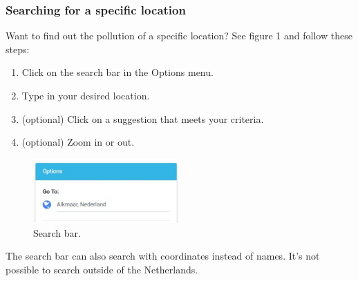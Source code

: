\documentclass[a4paper]{article}
\begin{document}
\subsubsection*{Searching for a specific location}
Want to find out the pollution of a specific location? See figure 1 and follow these steps:
\begin{enumerate}
\item Click on the search bar in the Options menu.
\item Type in your desired location.
\item (optional) Click on a suggestion that meets your criteria.
\item (optional) Zoom in or out.
\end{enumerate}
\begin{figure}[h!]
  \caption{Search bar.}
  \centering
  \includegraphics[width=0.5\textwidth]{search}
\end{figure}
The search bar can also search with coordinates instead of names. It's not possible to search outside of the Netherlands.
\newline
\end{document}
